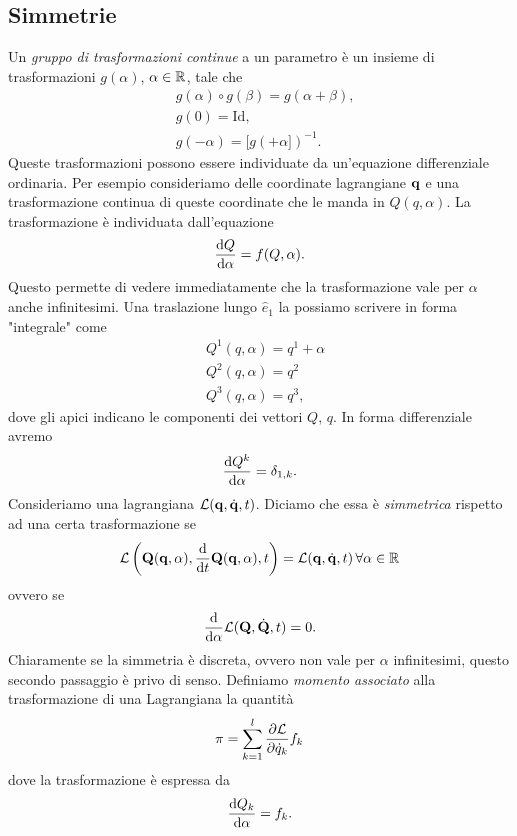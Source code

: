    \subsection{Simmetrie}
    Un \emph{gruppo di trasformazioni continue} a un parametro è un insieme di trasformazioni $g(\alpha)$, $\alpha \in \mathbb{R}$, tale che
   \begin{equation}
   \begin{aligned}
      & g(\alpha)\circ g(\beta) = g(\alpha+\beta),\\
      & g(0) = \mathrm{Id},\\
      & g(-\alpha) = [g(+\alpha])^{-1}.
    \end{aligned}
   \end{equation}
   Queste trasformazioni possono essere individuate da un'equazione differenziale ordinaria. Per esempio consideriamo delle coordinate lagrangiane $\mathbf{q}$ e una trasformazione continua di queste coordinate che le manda in $Q(q,\alpha)$. La trasformazione è individuata dall'equazione
   \begin{equation}
   \frac{\mathrm{d} Q}{\mathrm{d} \alpha}= f(Q,\alpha).
   \end{equation}
   Questo permette di vedere immediatamente che la trasformazione vale per $\alpha$ anche infinitesimi. Una traslazione lungo $\hat{e}_1$ la possiamo scrivere in forma "integrale" come
   \begin{equation}
   \begin{aligned}
      & Q^1(q,\alpha) = q^1+\alpha\\
      &Q^2(q,\alpha) = q^2\\
      &Q^3(q,\alpha) = q^3,
    \end{aligned}
   \end{equation}
   dove gli apici indicano le componenti dei vettori $Q,\,q.$ In forma differenziale avremo
   \begin{equation}
       \frac{\mathrm{d} Q^k}{\mathrm{d} \alpha} = \delta_{1,k}.
   \end{equation}
   Consideriamo una lagrangiana $\mathcal{L}(\mathbf{q},\dot{\mathbf{q}},t)$. Diciamo che essa è \emph{simmetrica} rispetto ad una certa trasformazione se
   \begin{equation}
       \mathcal{L}\left(\mathbf{Q}(\mathbf{q},\alpha),\frac{\mathrm{d}}{\mathrm{d}t} \mathbf{Q}(\mathbf{q},\alpha),t\right) =\mathcal{L}(\mathbf{q},\dot{\mathbf{q}},t) \, \forall \alpha \in \mathbb{R}
   \end{equation}
   ovvero se
   \begin{equation}
       \frac{\mathrm{d}}{\mathrm{d} \alpha}\mathcal{L}(\mathbf{Q},\dot{\mathbf{Q}},t) =0.
       \label{simmetria lagrangiana}
   \end{equation}
   Chiaramente se la simmetria è discreta, ovvero non vale per $\alpha$ infinitesimi, questo secondo passaggio è privo di senso.
   Definiamo \emph{momento associato} alla trasformazione di una Lagrangiana la quantità
   \begin{equation}
       \pi = \sum_{k=1}^l \frac{\partial \mathcal{L}}{\partial \dot{q}_k}f_k
   \end{equation}
   dove la trasformazione è espressa da
   \begin{equation}
       \frac{\mathrm{d} Q_k}{\mathrm{d} \alpha} = f_k.
   \end{equation}
   
